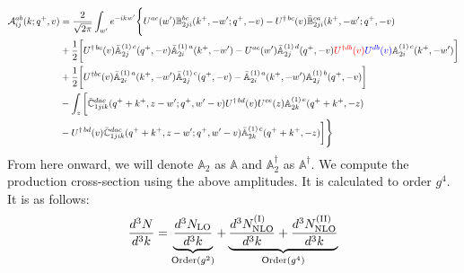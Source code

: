 \documentclass[aps,prd,amsmath,amssymb,nofootinbib]{revtex4-2}
\def\mf#1{\mathbb{#1}}
\numberwithin{equation}{section}
\begin{document}
\begin{align}
     {\cal A}^{ab}_{ij}(k; q^+, v) & = \frac{2}{\sqrt{2\pi}} \int_{w^{\prime}}e^{-i k w^\prime}\Bigg\{U^{ac}(w^{\prime}) \mf{B}^{bc}_{2ji}(k^{+},-w^{\prime};q^{+},-v)-U^{\dagger\, bc}(v)\Bar{\mf{B}}^{ca}_{2ji}(k^{+},-w^{\prime}; q^{+},-v)\notag \\ & +\frac{1}{2}\bigg[U^{\dagger\, bc}(v)\Bar{\mf{A}}^{(1)\, c}_{2j}(q^{+},-v)\Bar{\mf{A}}^{(1)\, a}_{2i}(k^{+},-w^{\prime})-U^{ac}(w^{\prime}) \Bar{\mf{A}}^{(1)\, d}_{2j}(q^{+},-v)\textcolor{red}{U^{\dagger db}(v)}\textcolor{blue}{U^{db}(v)} \mf{A}^{(1)\, c}_{2i}(k^{+},- w^{\prime})\bigg]\notag \\ & +\frac{1}{2}\bigg[U^{\dagger bc}(v)\Bar{\mf{A}}^{(1)\, a}_{2i}(k^{+},- w^{\prime})\Bar{\mf{A}}^{(1)\, c}_{2j}(q^{+},-v)-\Bar{\mf{A}}^{(1)\, a}_{2i}(k^{+},- w^{\prime}) \mf{A}^{(1)\, b}_{2j}(q^{+},- v)\bigg]\notag \\ & -\int_{z}\bigg[\Bar{\mf{C}}^{dac}_{1jik}(q^{+}+k^{+},z-w^{\prime}; q^{+},w^{\prime}-v)U^{\dagger\, bd}(v)U^{ce}(z) \mf{A}^{(1)\,e}_{2k}(q^{+}+k^{+},-z)\notag \\ &-U^{\dagger\, bd}(v) \Bar{\mf{C}}^{dac}_{1jik}(q^{+}+k^{+},z-w^{\prime}; q^{+},w^{\prime}-v)\Bar{\mf{A}}^{(1)\,c}_{2k}(q^{+}+k^{+},-z)\bigg]\Bigg\}
\end{align}
From here onward, we will denote $\mf{A}_{2}$ as $\mf{A}$ and $\mf{A}^{\dagger}_{2}$ as $\mf{A}^{\dagger}$. We compute the production cross-section using the above amplitudes. It is calculated to order $g^{4}$. It is as follows:
\begin{align}
    \frac{d^{3}N}{d^{3}k} = 
     \underbrace{\frac{d^{3}N_{\rm LO}}{d^{3}k}}_{\text{Order}(g^{2})}
     + 
    \underbrace{ \frac{d^{3}N_{\rm NLO}^{\rm (I)}}{d^{3}k}
     + \frac{d^{3}N_{\rm NLO}^{\rm (II)}}{d^{3}k}}_{\text{Order}(g^{4})}
\end{align}
\end{document}
